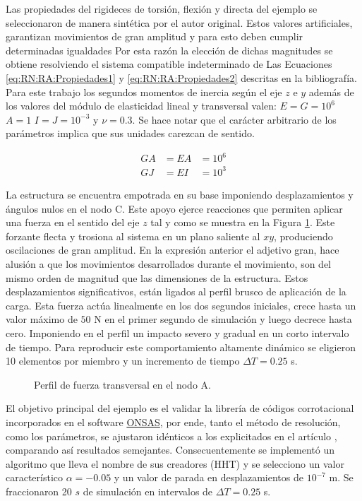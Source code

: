 Las propiedades del rigideces de torsión, flexión y directa del ejemplo se seleccionaron de manera sintética por el autor original. Estos valores artificiales, garantizan movimientos de gran amplitud y para esto deben cumplir determinadas igualdades Por esta razón la elección de dichas magnitudes se obtiene resolviendo el sistema compatible indeterminado de Las Ecuaciones \eqref{eq:RN:RA:Propiedades1} y \eqref{eq:RN:RA:Propiedades2} descritas en la bibliografía. Para este trabajo los segundos momentos de inercia según el eje $z$ e $y$ además de los valores del módulo de elasticidad lineal y transversal valen: $ E=G=10^6$ $A=1 $  $I=J=10^{-3}$ y $\nu=0.3$. Se hace notar que el carácter arbitrario de los parámetros implica que sus unidades carezcan de sentido. 

\begin{eqnarray}\label{eq:RN:RA:Propiedades1}
	GA &= EA& =10^6\\\label{eq:RN:RA:Propiedades2}
	GJ &= EI& =10^3
\end{eqnarray}

La estructura se encuentra empotrada en su base imponiendo desplazamientos y ángulos nulos en el nodo C. Este apoyo ejerce reacciones que permiten aplicar una fuerza en el sentido del eje $z$ tal y como se muestra en la Figura \ref{fig:RN:RA:Force}. Este forzante flecta y trosiona al sistema en un plano saliente al $xy$, produciendo oscilaciones de gran amplitud. En la expresión anterior el adjetivo gran, hace alusión a que los movimientos desarrollados durante el movimiento, son del mismo orden de magnitud que las dimensiones de la estructura. Estos desplazamientos significativos, están ligados al perfil brusco de aplicación de la carga. Esta fuerza actúa linealmente en los dos segundos iniciales, crece hasta un valor máximo de $50$ N en el primer segundo de simulación y luego decrece hasta cero. Imponiendo en el perfil un impacto severo y gradual en un corto intervalo de tiempo. Para reproducir este comportamiento altamente dinámico se eligieron 10 elementos por miembro y un incremento de tiempo $\Delta T = 0.25$ s. 


\begin{figure}[htbp]
	\centering
	\def\svgwidth{80mm}
	
	\caption{Perfil de fuerza transversal en el nodo A.}
	\label{fig:RN:RA:Force}
\end{figure}

El objetivo principal del ejemplo es el validar la librería de códigos corrotacional incorporados en el software \href{https://github.com/ONSAS/ONSAS/}{ONSAS}, por ende, tanto el método de resolución, como los parámetros, se ajustaron idénticos a los explicitados en el artículo \cite{Le2014}, comparando así resultados semejantes. Consecuentemente se implementó un algoritmo que lleva el nombre de sus creadores (HHT) y se selecciono un valor característico $\alpha=-0.05$ y un valor de parada en desplazamientos de $10^{-7}$ m. Se fraccionaron 20 $s$ de simulación en intervalos de $\Delta T=0.25$ s.

